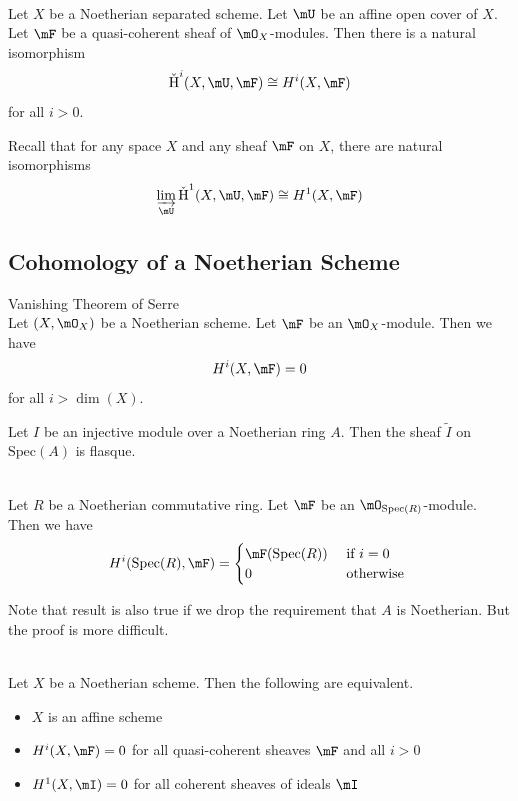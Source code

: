 \documentclass[a4paper]{article}
\begin{document}
\begin{prp}{}{}\\
Let $X$ be a Noetherian separated scheme. Let $\mU$ be an affine open cover of $X$. Let $\mF$ be a quasi-coherent sheaf of $\mO_X$-modules. Then there is a natural isomorphism $$\text{\v{H}}^i(X,\mU,\mF)\cong H^i(X,\mF)$$ for all $i>0$. 
\end{prp}

Recall that for any space $X$ and any sheaf $\mF$ on $X$, there are natural isomorphisms $$\varinjlim_{\mU}\text{\v{H}}^1(X,\mU,\mF)\cong H^1(X,\mF)$$

\subsection{Cohomology of a Noetherian Scheme}
\begin{thm}{Vanishing Theorem of Serre}{}\\
Let $(X,\mO_X)$ be a Noetherian scheme. Let $\mF$ be an $\mO_X$-module. Then we have $$H^i(X,\mF)=0$$ for all $i>\dim(X)$. 
\end{thm}

\begin{prp}{}{} Let $I$ be an injective module over a Noetherian ring $A$. Then the sheaf $\widetilde{I}$ on $\text{Spec}(A)$ is flasque. 
\end{prp}

\begin{prp}{}{}\\
Let $R$ be a Noetherian commutative ring. Let $\mF$ be an $\mO_{\text{Spec}(R)}$-module. Then we have $$H^i(\text{Spec}(R),\mF)=\begin{cases}
\mF(\text{Spec}(R)) & \text{ if } i=0\\
0 & \text{ otherwise }
\end{cases}$$
\end{prp}

Note that result is also true if we drop the requirement that $A$ is Noetherian. But the proof is more difficult. 

\begin{thm}{}{}\\
Let $X$ be a Noetherian scheme. Then the following are equivalent. 
\begin{itemize}
\item $X$ is an affine scheme
\item $H^i(X,\mF)=0$ for all quasi-coherent sheaves $\mF$ and all $i>0$
\item $H^1(X,\mI)=0$ for all coherent sheaves of ideals $\mI$
\end{itemize}
\end{thm}
\end{document}
